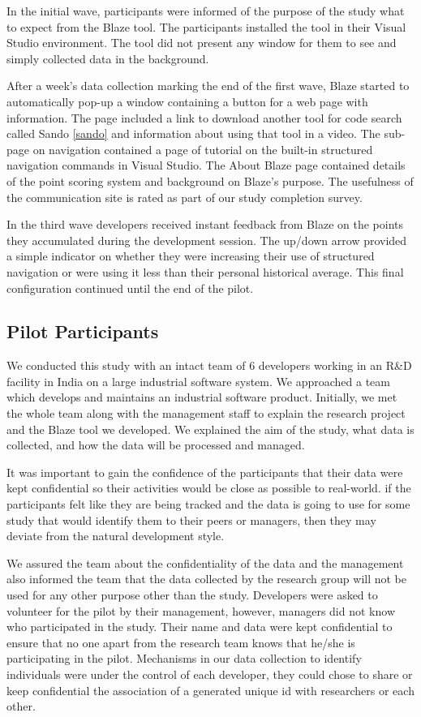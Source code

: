 \documentclass{sig-alternate}
\begin{document}
In the initial wave, participants were informed of the purpose of the study what to expect from the Blaze tool.  The participants installed the tool in their Visual Studio environment.  The tool did not present any window for them to see and simply collected data in the background.   

After a week's data collection marking the end of the first wave, Blaze started to automatically pop-up a window containing a button for a web page with information.  The page included a link to download another tool for code search called Sando \ref{sando} and information about using that tool in a video.  The sub-page on navigation contained a page of tutorial on the built-in structured navigation commands in Visual Studio.  The About Blaze page contained details of the point scoring system and background on Blaze's purpose.  The usefulness of the communication site is rated as part of our study completion survey.

In the third wave developers received instant feedback from Blaze on the points they accumulated during the development session.  The up/down arrow provided a simple indicator on whether they were increasing their use of structured navigation or were using it less than their personal historical average.  This final configuration continued until the end of the pilot.  

\subsection{Pilot Participants}


We conducted this study with an intact team of 6 developers working in an R\&D facility in India on a large industrial software system. We approached a team which develops and maintains an industrial software product. Initially, we met the whole team along with the management staff to explain the research project and the Blaze tool we developed. We  explained the aim of the study, what data is collected, and how the data will be processed and managed. 

It was important to gain the confidence of the participants that their data were kept confidential so their activities would be close as possible to real-world. if the participants felt like they are being tracked and the data is going to use for some study that would identify them to their peers or managers, then they may deviate from the natural development style.

We  assured the team about the confidentiality of the data and the management also informed the team that the data collected by the research group will not be used for any other purpose other than the study.  Developers were asked to volunteer for the pilot by their management, however, managers did not know who participated in the study. Their name and data were kept confidential to ensure that no one apart from the research team knows that he/she is participating in the pilot. Mechanisms in our data collection to identify individuals were under the control of each developer, they could chose to share or keep confidential the association of a generated unique id with researchers or each other.   
\end{document}
